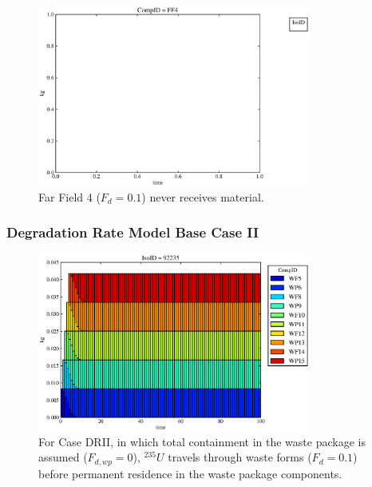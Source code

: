 \begin{frame}
\begin{figure}
\begin{minipage}[b]{0.45\linewidth}
  \includegraphics[width=0.8\textwidth]{./images/drI0.eps}
  \caption[Case DRI Far Field Contaminants.]{ 
    Far Field 4 ($F_d = 0.1$) never receives material.
    }
  \label{fig:drIff0}

  \end{minipage}
\end{figure}
\end{frame}



\begin{frame}[ctb!]
  \frametitle{Degradation Rate Model Base Case II}
\begin{figure}[ht]
\centering
\includegraphics[width=0.8\textwidth]{./images/drII.eps}
\caption[$^{235}U$ residence. Degradation Rate WP No Release.]{
For Case DRII, in which total containment in the waste package is assumed ($F_{d,wp}=0$), 
$^{235}U$ travels through waste forms ($F_d = 0.1$) before 
permanent residence in the waste package components.
}
\label{fig:drIIall}
\end{figure}
\end{frame}

